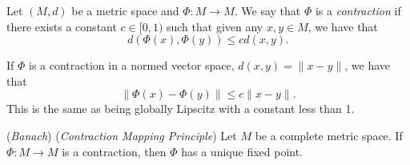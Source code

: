 \documentclass[11pt]{article}
\theoremstyle{definition}
\begin{document}
\begin{mdframed}[backgroundcolor = blue!10]
\vspace{+0.2cm}
 Let $(M,d)$ be a metric space and $\Phi:M\to M$. We say that $\Phi$ is a \textit{contraction} if there exists a constant $c\in[0,1)$ such that given any $x,y\in M$, we have that $$d\left(\Phi(x),\Phi(y)\right)\leq cd(x,y).$$
\end{mdframed}
\note If $\Phi$ is a contraction in a normed vector space, $d(x,y)=\|x-y\|$, we have that
$$
\|\Phi(x)-\Phi(y)\|\leq c\|x-y\|.
$$
This is the same as being globally Lipscitz with a constant less than 1.

\begin{shaded}
\theorem (\textit{Banach}) (\textit{Contraction Mapping Principle}) Let $M$ be a complete metric space. If $\Phi:M\to M$ is a contraction, then $\Phi$ has a unique fixed point.
\end{shaded}
\end{document}
